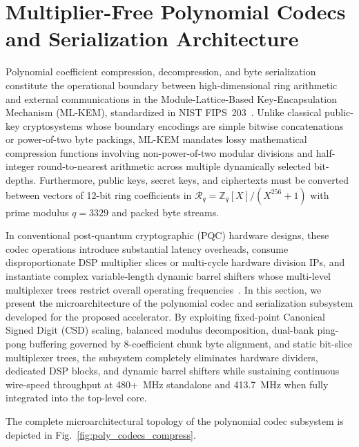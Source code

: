 
\section{Multiplier-Free Polynomial Codecs and Serialization Architecture}
\label{sec:poly_codecs}

Polynomial coefficient compression, decompression, and byte serialization constitute the operational boundary between high-dimensional ring arithmetic and external communications in the Module-Lattice-Based Key-Encapsulation Mechanism (\mbox{ML-KEM}), standardized in NIST FIPS~203~\cite{fips203}. Unlike classical public-key cryptosystems whose boundary encodings are simple bitwise concatenations or power-of-two byte packings, \mbox{ML-KEM} mandates lossy mathematical compression functions involving non-power-of-two modular divisions and half-integer round-to-nearest arithmetic across multiple dynamically selected bit-depths. Furthermore, public keys, secret keys, and ciphertexts must be converted between vectors of 12-bit ring coefficients in $\mathcal{R}_q = \mathbb{Z}_q[X]/(X^{256} + 1)$ with prime modulus $q = 3329$ and packed byte streams.

In conventional post-quantum cryptographic (PQC) hardware designs, these codec operations introduce substantial latency overheads, consume disproportionate DSP multiplier slices or multi-cycle hardware division IPs, and instantiate complex variable-length dynamic barrel shifters whose multi-level multiplexer trees restrict overall operating frequencies~\cite{xing2023tcas1, imran2022tvlsi}. In this section, we present the microarchitecture of the polynomial codec and serialization subsystem developed for the proposed accelerator. By exploiting fixed-point Canonical Signed Digit (CSD) scaling, balanced modulus decomposition, dual-bank ping-pong buffering governed by 8-coefficient chunk byte alignment, and static bit-slice multiplexer trees, the subsystem completely eliminates hardware dividers, dedicated DSP blocks, and dynamic barrel shifters while sustaining continuous wire-speed throughput at 480+~MHz standalone and 413.7~MHz when fully integrated into the top-level core.

The complete microarchitectural topology of the polynomial codec subsystem is depicted in Fig.~\ref{fig:poly_codecs_compress}.

